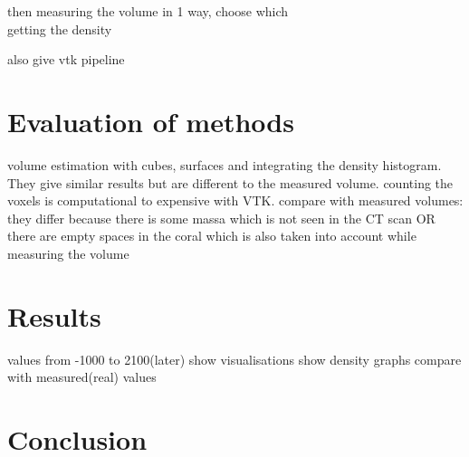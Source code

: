\documentclass[12pt]{article}
\begin{document}
then measuring the volume in 1 way, choose which\\
getting the density 

also give vtk pipeline

\section{Evaluation of methods}
volume estimation with cubes, surfaces and integrating the density histogram. They give similar results but are different to the measured volume. counting the voxels is computational to expensive with VTK.
compare with measured volumes:
they differ because there is some massa which is not seen in the CT scan OR there are empty spaces in the coral which is also taken into account while measuring the volume

\section{Results}
values from -1000 to 2100(later)
show visualisations
show density graphs
compare with measured(real) values
\section{Conclusion}
\end{document}
